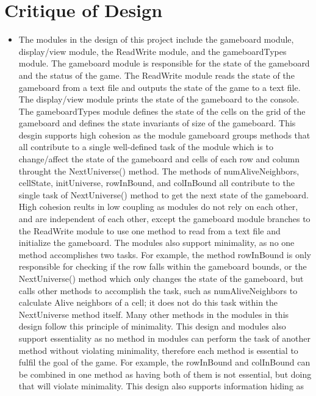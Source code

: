 \documentclass[12pt]{article}
\begin{document}
\newpage

\section*{Critique of Design}

\begin{itemize}
\item The modules in the design of this project include the gameboard module, display/view module, 
the ReadWrite module, and the gameboardTypes module. The gameboard module is responsible for the state
of the gameboard and the status of the game. The ReadWrite module reads the state of the gameboard from a text file
and outputs the state of the game to a text file. The display/view module prints the state of the gameboard to the console.
The gameboardTypes module defines the state of the cells on the grid of the gameboard and defines the state invariants of size of
the gameboard. This desgin supports high cohesion as the module gameboard groups methods that all contribute to a single well-defined 
task of the module which is to change/affect the state of the gameboard and cells of each row and column throught the NextUniverse() method.
The methods of numAliveNeighbors, cellState, initUniverse, rowInBound, and colInBound all contribute to the single task of NextUniverse() method to
get the next state of the gameboard. High cohesion reults in low coupling as modules do not rely on each other, and are independent of each other, except
the gameboard module branches to the ReadWrite module to use one method to read from a text file and initialize the gameboard. The modules also support minimality,
as no one method accomplishes two tasks. For example, the method rowInBound is only responsible for checking if the row falls within the gameboard bounds, or the NextUniverse()
method which only changes the state of the gameboard, but calls other methods to accomplish the task, such as numAliveNeighbors to calculate Alive neighbors of a cell; it does not
do this task within the NextUniverse method itself. Many other methods in the modules in this design follow this principle of minimality. This design and modules also support
essentiality as no method in modules can perform the task of another method without violating minimality, therefore each method is essential to fulfil the goal of the game. For example, 
the rowInBound and colInBound can be combined in one method as having both of them is not essential, but doing that will violate minimality. This design also supports information hiding as

\end{itemize}
\end{document}
